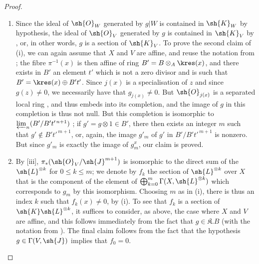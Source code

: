 \begin{proof}
\medskip\noindent
\begin{enumerate}
    \item[\rm{(i)}] Since the ideal of $\sh{O}_W$ generated by $g|W$ is contained in $\sh{K}_W$ by hypothesis, the ideal of $\sh{O}_V$ generated by $g$ is contained in $\sh{K}_V$ by , or, in other words, $g$ is a section of $\sh{K}_V$.
        To prove the second claim of (i), we can again assume that $X$ and $V$ are affine, and reuse the notation from ;
        the fibre $\pi^{-1}(x)$ is then affine of ring $B'=B\otimes_A\kres(x)$, and there exists in $B'$ an element $t'$ which is not a zero divisor and is such that $B'=\kres(x)\oplus B't'$.
        Since $j(x)$ is a specialisation of $z$ and since $g(z)\neq0$, we necessarily have that $g_{j(x)}\neq0$.
        But $\sh{O}_{j(x)}$ is a separated local ring , and thus embeds into its completion, and the image of $g$ in this completion is thus not null.
        But this completion is isomorphic to $\varprojlim_n(B'/B't'^{\,n+1})$ ;
        if $g'=g\otimes1\in B'$, there then exists an integer $m$ such that $g'\not\in B't'^{\,m+1}$, or, again, the image $g'_m$ of $g'$ in $B'/B't'^{\,m+1}$ is nonzero.
        But since $g'_m$ is exactly the image of $g_m^x$, our claim is proved.
    \item[\rm{(ii)}] By [iii], $\pi_*(\sh{O}_V/\sh{J}^{m+1})$ is isomorphic to the direct sum of the $\sh{L}^{\otimes k}$ for $0\leq k\leq m$;
        we denote by $f_k$ the section of $\sh{L}^{\otimes k}$ over $X$ that is the component of the element of $\bigoplus_{k=0}^m\Gamma(X,\sh{L}^{\otimes k})$ which corresponds to $g_m$ by this isomorphism.
        Choosing $m$ as in (i), there is thus an index $k$ such that $f_k(x)\neq0$, by (i).
        To see that $f_k$ is a section of $\sh{K}\sh{L}^{\otimes k}$, it suffices to consider, as above, the case where $X$ and $V$ are affine, and this follows immediately from the fact that $g\in\mathfrak{K}.B$ (with the notation from ).
        The final claim follows from the fact that the hypothesis $g\in\Gamma(V,\sh{J})$ implies that $f_0=0$.
\end{enumerate}
\end{proof}

